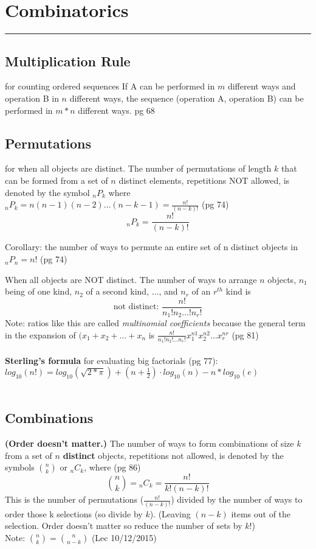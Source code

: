 \section{Combinatorics}
\smallskip \hrule height 2pt \smallskip

\subsection{Multiplication Rule} for counting ordered sequences
If A can be performed in $m$ different ways and operation B in $n$ different ways, the sequence (operation A, operation B) can be performed in $m*n$ different ways. {\tiny pg 68}

\subsection{Permutations} for when all objects are distinct.
The number of permutations of length $k$ that can be formed from a set of $n$ distinct elements, repetitions NOT allowed, is denoted by the symbol ${_n}P_k$ where ${_n}P_k = n(n-1)(n-2) \dots (n - k - 1) = \frac{n!}{(n-k)!}$  {\tiny (pg 74) }\hfill \\
\[  {_n}P_k = \frac{n!}{(n-k)!} \]

Corollary: the number of ways to permute an entire set of n distinct objects in ${_n}P_n = n!$    {\tiny (pg 74) }\

When all objects are NOT distinct.  The number of ways to arrange $n$ objects, $n_1$ being of one kind, $n_2$ of a second kind, $\dots$, and $n_r$ of an $r^{th}$ kind is 
\[ \mbox{not distinct: } \frac{n!}{n{_1}!n{_2} \dots !n{_r!}} \]
Note: ratios like this are called \textit{multinomial coefficients} because the general term in the expansion of $(x_1 + x_2 + \dots + x_n$ is $\frac{n!}{n_1!n_2!\dots n_r!}x_1^{n1}x_2^{n2} \dots x_r^{nr}$  {\tiny (pg 81) }\hfill \\
\hfill \\
\textbf{Sterling's formula} for evaluating big factorials {\tiny (pg 77)}: $log_{10}(n!) = log_{10}(\sqrt{2*\pi}) + (n + \frac{1}{2}) \cdot log_{10}(n) - n*log_{10}(e)$ \hfill \\
\hfill \\

\subsection{Combinations}
\textbf{(Order doesn't matter.)} The number of ways to form combinations of size $k$ from a set of $n$ \textbf{distinct} objects, repetitions not allowed, is denoted by the symbols $\binom{n}{k}$ or ${_n}C_k$, where   {\tiny (pg 86)}
	\[ {n \choose k} = {_n}C_k = \frac{n!}{k!(n-k)!} \]
This is the number of permutations ($\frac{n!}{(n-k)!}$) divided by the number of ways to order those k selections (so divide by $k$).
(Leaving $(n-k)$ items out of the selection.  Order doesn't matter so reduce the number of sets by $k!$) \hfill \\
Note: ${n \choose k} = {n \choose n - k}$  (Lec 10/12/2015)

